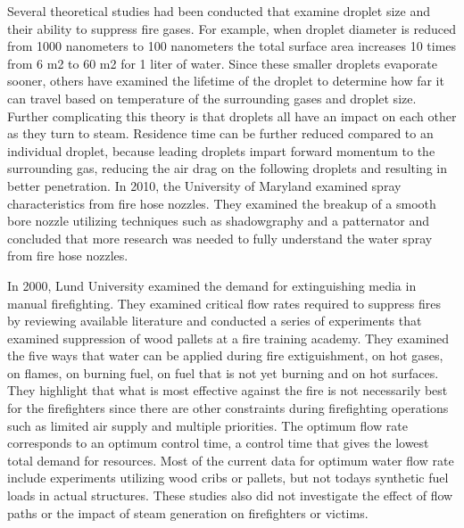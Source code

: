\documentclass[12pt,oneside]{book}
\begin{document}
Several theoretical studies had been conducted that examine droplet size and their ability to suppress fire gases. For example, when droplet diameter is reduced from 1000 nanometers to 100 nanometers the total surface area increases 10 times from 6 m2 to 60 m2 for 1 liter of water. Since these smaller droplets evaporate sooner, others have examined the lifetime of the droplet to determine how far it can travel based on temperature of the surrounding gases and droplet size. Further complicating this theory is that droplets all have an impact on each other as they turn to steam. Residence time can be further reduced compared to an individual droplet, because leading droplets impart forward momentum to the surrounding gas, reducing the air drag on the following droplets and resulting in better penetration. In 2010, the University of Maryland examined spray characteristics from fire hose nozzles. They examined the breakup of a smooth bore nozzle utilizing techniques such as shadowgraphy and a patternator and concluded that more research was needed to fully understand the water spray from fire hose nozzles.  

In 2000, Lund University examined the demand for extinguishing media in manual firefighting. They examined critical flow rates required to suppress fires by reviewing available literature and conducted a series of experiments that examined suppression of wood pallets at a fire training academy. They examined the five ways that water can be applied during fire extiguishment, on hot gases, on flames, on burning fuel, on fuel that is not yet burning and on hot surfaces. They highlight that what is most effective against the fire is not necessarily best for the firefighters since there are other constraints during firefighting operations such as limited air supply and multiple priorities. The optimum flow rate corresponds to an optimum control time, a control time that gives the lowest total demand for resources. Most of the current data for optimum water flow rate include experiments utilizing wood cribs or pallets, but not todays synthetic fuel loads in actual structures.  These studies also did not investigate the effect of flow paths or the impact of steam generation on firefighters or victims.
\end{document}
